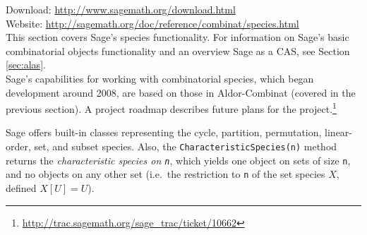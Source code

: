 \documentclass[12pt]{article}
\theoremstyle{plain}
\newcommand{\codefont}[1]{{\fontshape{n}\texttt{#1}}}
\begin{document}
Download: \url{http://www.sagemath.org/download.html}
\\
Website: \url{http://sagemath.org/doc/reference/combinat/species.html}
\\

This section covers Sage's species functionality.
For information on Sage's basic combinatorial objects functionality and an overview Sage as a CAS, see Section \ref{sec:alas}.
\\


Sage's capabilities for working with combinatorial species,
which began development around 2008,
are based on those in Aldor-Combinat (covered in the previous section).
A project roadmap describes future plans for the project.\footnote{
 \url{http://trac.sagemath.org/sage_trac/ticket/10662}
}




Sage offers built-in classes representing the
cycle,
partition,
permutation,
linear-order,
set, and
subset
species.
Also, the \codefont{CharacteristicSpecies(n)} method returns the \emph{characteristic species on \codefont{n}}, which
yields
one object on sets of size \codefont{n}, and no objects on any other set (i.e.\ the restriction to \codefont{n} of the set species \(X\), defined \(X[U]=U\)).
\end{document}
